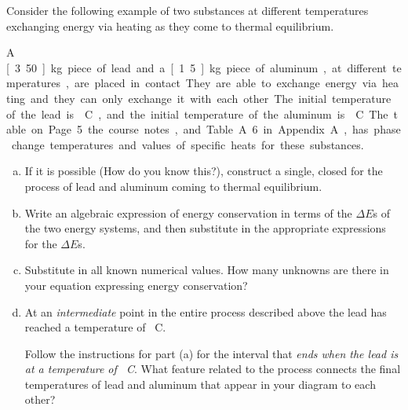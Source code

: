 \label{FNT1.2.1-2}

Consider the following example of two substances at different temperatures exchanging energy via heating as they come to thermal equilibrium.

A \unit[3.50]{kg} piece of lead and a \unit[1.5]{kg} piece of aluminum, at different temperatures, are placed in contact. They are able to exchange energy via heating and they can only exchange it with each other. The initial temperature of the lead is \unit[48]{\textdegree C}, and the initial temperature of the aluminum is \unit[35]{\textdegree C}. The table on Page 5 the course notes, and Table A.6 in Appendix A, has phase change temperatures and values of specific heats for these substances. 

\begin{enumerate}[(a)]
	\item If it is possible (How do you know this?), construct a single, closed \EnergyDiagram{} for the process of lead and aluminum coming to thermal equilibrium.

	\item Write an algebraic expression of energy conservation in terms of the $\Delta E$s of the two energy systems, and then substitute in the appropriate expressions for the $\Delta E$s.

	\item Substitute in all known numerical values. How many unknowns are there in your equation expressing energy conservation?

	\item At an {\em intermediate} point in the entire process described above the lead has reached a temperature of \unit[43]{\textdegree C}.
	
	Follow the instructions for part (a) for the interval that \emph{ends when the lead is at a temperature of \unit[43]{\textdegree C}}. What feature related to the process connects the final temperatures of lead and aluminum that appear in your diagram to each other?

\end{enumerate}